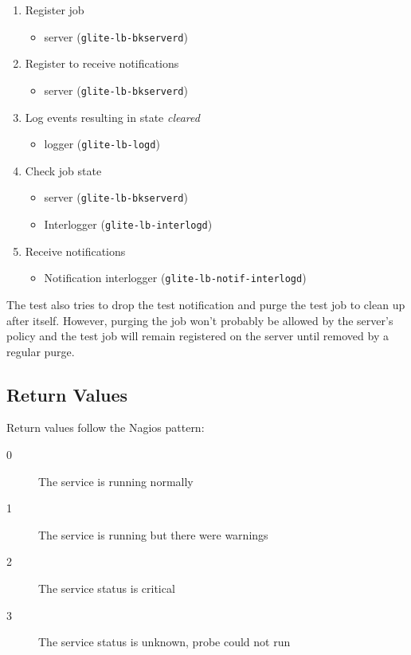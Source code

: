 \begin{enumerate}
\item Register job
	\begin{itemize}
	\item \LB server (\texttt{glite-lb-bkserverd})
	\end{itemize}
\item Register to receive notifications 
	\begin{itemize}
	\item \LB server (\texttt{glite-lb-bkserverd}) 
	\end{itemize}
\item Log events resulting in state \emph{cleared}
	\begin{itemize}
	\item \LB logger (\texttt{glite-lb-logd})
	\end{itemize}
\item Check job state
	\begin{itemize}
	\item \LB server (\texttt{glite-lb-bkserverd}) 
	\item Interlogger (\texttt{glite-lb-interlogd})
	\end{itemize}
\item Receive notifications
	\begin{itemize}
	\item Notification interlogger (\texttt{glite-lb-notif-interlogd})
	\end{itemize}
\end{enumerate}

The test also tries to drop the test notification and purge the test job to clean up after itself. However, purging the job won't probably be allowed by the \LB server's policy and the test job will remain registered on the \LB server until removed by a regular purge.

\subsection{Return Values}
Return values follow the Nagios pattern:

\begin{description}
\item[0] The service is running normally
\item[1] The service is running but there were warnings
\item[2] The service status is critical
\item[3] The service status is unknown, probe could not run
\end{description}

